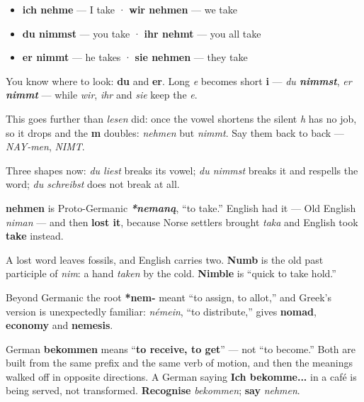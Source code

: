 \begin{itemize}
\raggedright
  \item \textbf{ich nehme} — I take · \textbf{wir nehmen} — we take
  \item \textbf{du nimmst} — you take · \textbf{ihr nehmt} — you all take
  \item \textbf{er nimmt} — he takes · \textbf{sie nehmen} — they take
\end{itemize}

\begin{grammarlens}[title={Grammar Lens: the rule again, and harder}]
You know where to look: \textbf{du} and \textbf{er}. Long \emph{e} becomes short \textbf{i} — \emph{du \textbf{nimmst}}, \emph{er \textbf{nimmt}} — while \emph{wir}, \emph{ihr} and \emph{sie} keep the \emph{e}.

This goes further than \emph{lesen} did: once the vowel shortens the silent \emph{h} has no job, so it drops and the \textbf{m} doubles: \emph{nehmen} but \emph{nimmt}. Say them back to back — \emph{NAY-men}, \emph{NIMT}.

Three shapes now: \emph{du liest} breaks its vowel; \emph{du nimmst} breaks it and respells the word; \emph{du schreibst} does not break at all.
\end{grammarlens}

\begin{cousinweb}
\textbf{nehmen} is Proto-Germanic \emph{\textbf{*nemaną}}, \textquotedblleft{}to take.\textquotedblright{} English had it — Old English \emph{niman} — and then \textbf{lost it}, because Norse settlers brought \emph{taka} and English took \textbf{take} instead.

A lost word leaves fossils, and English carries two. \textbf{Numb} is the old past participle of \emph{nim}: a hand \emph{taken} by the cold. \textbf{Nimble} is \textquotedblleft{}quick to take hold.\textquotedblright{}

Beyond Germanic the root \textbf{*nem-} meant \textquotedblleft{}to assign, to allot,\textquotedblright{} and Greek's version is unexpectedly familiar: \emph{némein}, \textquotedblleft{}to distribute,\textquotedblright{} gives \textbf{nomad}, \textbf{economy} and \textbf{nemesis}.
\end{cousinweb}

\begin{culture}
German \textbf{bekommen} means \textquotedblleft{}\textbf{to receive, to get}\textquotedblright{} — not \textquotedblleft{}to become.\textquotedblright{} Both are built from the same prefix and the same verb of motion, and then the meanings walked off in opposite directions. A German saying \textbf{Ich bekomme...} in a café is being served, not transformed. \textbf{Recognise} \emph{bekommen}; \textbf{say} \emph{nehmen}.
\end{culture}

